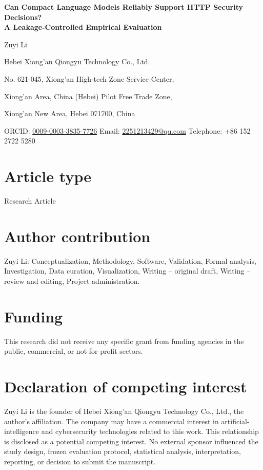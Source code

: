 \documentclass[10pt]{article}
\begin{document}
\pagestyle{empty}

\begin{center}
{\Large\bfseries Can Compact Language Models Reliably Support HTTP Security Decisions?\\[0.25em]
A Leakage-Controlled Empirical Evaluation}\par
\vspace{0.8em}
{\large Zuyi Li}\par
\vspace{0.25em}
Hebei Xiong'an Qiongyu Technology Co., Ltd.\par
No. 621-045, Xiong'an High-tech Zone Service Center,\par
Xiong'an Area, China (Hebei) Pilot Free Trade Zone,\par
Xiong'an New Area, Hebei 071700, China\par
\vspace{0.35em}
ORCID: \href{https://orcid.org/0009-0003-3835-7726}{0009-0003-3835-7726}\quad
Email: \href{mailto:2251213429@qq.com}{2251213429@qq.com}\quad
Telephone: +86 152 2722 5280
\end{center}

\section*{Article type}
Research Article

\section*{Author contribution}
Zuyi Li: Conceptualization, Methodology, Software, Validation, Formal analysis, Investigation, Data curation, Visualization, Writing -- original draft, Writing -- review and editing, Project administration.

\section*{Funding}
This research did not receive any specific grant from funding agencies in the public, commercial, or not-for-profit sectors.

\section*{Declaration of competing interest}
Zuyi Li is the founder of Hebei Xiong'an Qiongyu Technology Co., Ltd., the author's affiliation. The company may have a commercial interest in artificial-intelligence and cybersecurity technologies related to this work. This relationship is disclosed as a potential competing interest. No external sponsor influenced the study design, frozen evaluation protocol, statistical analysis, interpretation, reporting, or decision to submit the manuscript.
\end{document}
